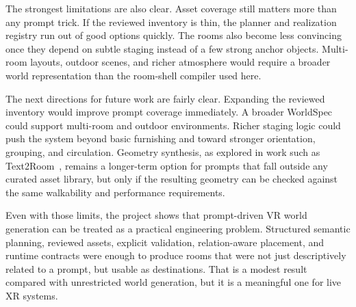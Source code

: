 \documentclass[12pt]{article}
\begin{document}
The strongest limitations are also clear. Asset coverage still matters more than any prompt trick. If the reviewed inventory is thin, the planner and realization registry run out of good options quickly. The rooms also become less convincing once they depend on subtle staging instead of a few strong anchor objects. Multi-room layouts, outdoor scenes, and richer atmosphere would require a broader world representation than the room-shell compiler used here.

The next directions for future work are fairly clear. Expanding the reviewed inventory would improve prompt coverage immediately. A broader WorldSpec could support multi-room and outdoor environments. Richer staging logic could push the system beyond basic furnishing and toward stronger orientation, grouping, and circulation. Geometry synthesis, as explored in work such as Text2Room~\cite{hoellein2023text2room}, remains a longer-term option for prompts that fall outside any curated asset library, but only if the resulting geometry can be checked against the same walkability and performance requirements.

Even with those limits, the project shows that prompt-driven VR world generation can be treated as a practical engineering problem. Structured semantic planning, reviewed assets, explicit validation, relation-aware placement, and runtime contracts were enough to produce rooms that were not just descriptively related to a prompt, but usable as destinations. That is a modest result compared with unrestricted world generation, but it is a meaningful one for live XR systems.



\end{document}
